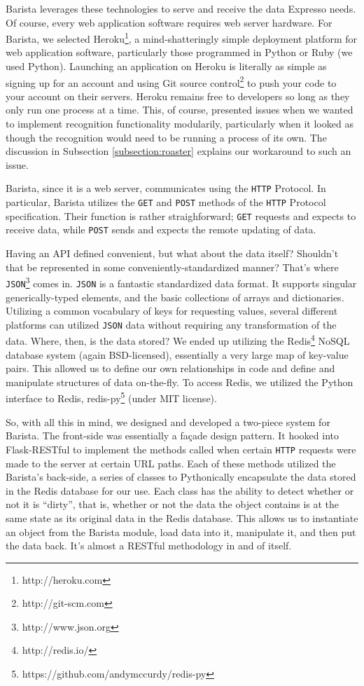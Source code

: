 \documentclass{acm_proc_article-sp}
\begin{document}
Barista leverages these technologies to serve and receive the data Expresso needs. Of course, every web application software requires web server hardware. For Barista, we selected Heroku\footnote{http://heroku.com}, a mind-shatteringly simple deployment platform for web application software, particularly those programmed in Python or Ruby (we used Python). Launching an application on Heroku is literally as simple as signing up for an account and using Git source control\footnote{http://git-scm.com} to push your code to your account on their servers. Heroku remains free to developers so long as they only run one process at a time. This, of course, presented issues when we wanted to implement recognition functionality modularily, particularly when it looked as though the recognition would need to be running a process of its own. The discussion in Subsection \ref{subsection:roaster} explains our workaround to such an issue.

Barista, since it is a web server, communicates using the \texttt{HTTP} Protocol. In particular, Barista utilizes the \texttt{GET} and \texttt{POST} methods of the \texttt{HTTP} Protocol specification. Their function is rather straighforward; \texttt{GET} requests and expects to receive data, while \texttt{POST} sends and expects the remote updating of data. 

Having an API defined convenient, but what about the data itself? Shouldn't that be represented in some conveniently-standardized manner? That's where \texttt{JSON}\footnote{http://www.json.org} comes in. \texttt{JSON} is a fantastic standardized data format. It supports singular generically-typed elements, and the basic collections of arrays and dictionaries. Utilizing a common vocabulary of keys for requesting values, several different platforms can utilized \texttt{JSON} data without requiring any transformation of the data. Where, then, is the data stored? We ended up utilizing the Redis\footnote{http://redis.io/} NoSQL database system (again BSD-licensed), essentially a very large map of key-value pairs. This allowed us to define our own relationships in code and define and manipulate structures of data on-the-fly. To access Redis, we utilized the Python interface to Redis, redis-py\footnote{https://github.com/andymccurdy/redis-py} (under MIT license).

So, with all this in mind, we designed and developed a two-piece system for Barista. The front-side was essentially a fa\c{c}ade design pattern. It hooked into Flask-RESTful to implement the methods called when certain \texttt{HTTP} requests were made to the server at certain URL paths. Each of these methods utilized the Barista's back-side, a series of classes to Pythonically encapsulate the data stored in the Redis database for our use. Each class has the ability to detect whether or not it is ``dirty'', that is, whether or not the data the object contains is at the same state as its original data in the Redis database. This allows us to instantiate an object from the Barista module, load data into it, manipulate it, and then put the data back. It's almost a RESTful methodology in and of itself.
\end{document}
